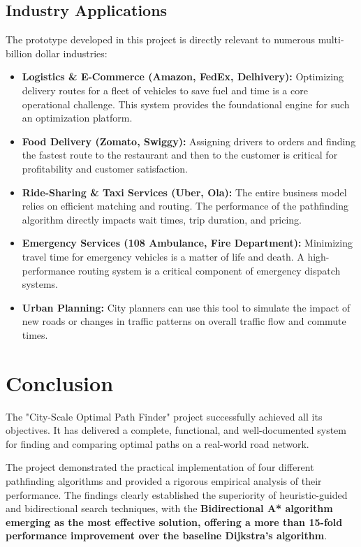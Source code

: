\documentclass[12pt, a4paper]{report}
\begin{document}
\section{Industry Applications}
The prototype developed in this project is directly relevant to numerous multi-billion dollar industries:
\begin{itemize}
    \item \textbf{Logistics & E-Commerce (Amazon, FedEx, Delhivery):} Optimizing delivery routes for a fleet of vehicles to save fuel and time is a core operational challenge. This system provides the foundational engine for such an optimization platform.
    \item \textbf{Food Delivery (Zomato, Swiggy):} Assigning drivers to orders and finding the fastest route to the restaurant and then to the customer is critical for profitability and customer satisfaction.
    \item \textbf{Ride-Sharing & Taxi Services (Uber, Ola):} The entire business model relies on efficient matching and routing. The performance of the pathfinding algorithm directly impacts wait times, trip duration, and pricing.
    \item \textbf{Emergency Services (108 Ambulance, Fire Department):} Minimizing travel time for emergency vehicles is a matter of life and death. A high-performance routing system is a critical component of emergency dispatch systems.
    \item \textbf{Urban Planning:} City planners can use this tool to simulate the impact of new roads or changes in traffic patterns on overall traffic flow and commute times.
\end{itemize}

\clearpage
\chapter{Conclusion}

The "City-Scale Optimal Path Finder" project successfully achieved all its objectives. It has delivered a complete, functional, and well-documented system for finding and comparing optimal paths on a real-world road network.

The project demonstrated the practical implementation of four different pathfinding algorithms and provided a rigorous empirical analysis of their performance. The findings clearly established the superiority of heuristic-guided and bidirectional search techniques, with the \textbf{Bidirectional A* algorithm emerging as the most effective solution, offering a more than 15-fold performance improvement over the baseline Dijkstra's algorithm}.
\end{document}
